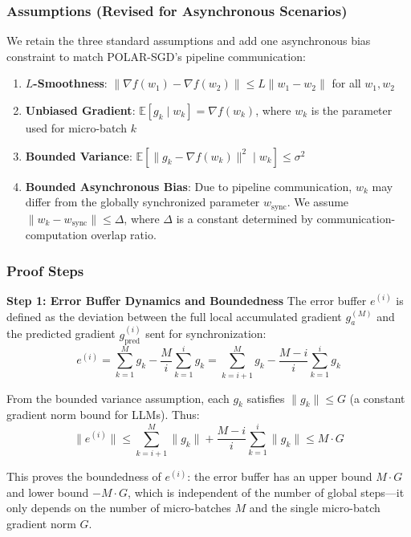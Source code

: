 \subsubsection{Assumptions (Revised for Asynchronous Scenarios)}
We retain the three standard assumptions and add one asynchronous bias constraint to match POLAR-SGD's pipeline communication:
\begin{enumerate}
  \item \textbf{$L$-Smoothness}: $\|\nabla f(w_1) - \nabla f(w_2)\| \leq L\|w_1 - w_2\|$ for all $w_1,w_2$
  \item \textbf{Unbiased Gradient}: $\mathbb{E}[g_{k} \mid w_k] = \nabla f(w_k)$, where $w_k$ is the parameter used for micro-batch $k$
  \item \textbf{Bounded Variance}: $\mathbb{E}\left[\|g_{k} - \nabla f(w_k)\|^2 \mid w_k\right] \leq \sigma^2$
  \item \textbf{Bounded Asynchronous Bias}: Due to pipeline communication, $w_k$ may differ from the globally synchronized parameter $w_{\text{sync}}$. We assume $\|w_k - w_{\text{sync}}\| \leq \Delta$, where $\Delta$ is a constant determined by communication-computation overlap ratio.
\end{enumerate}

\subsubsection{Proof Steps}
\textbf{Step 1: Error Buffer Dynamics and Boundedness}
The error buffer $e^{(i)}$ is defined as the deviation between the full local accumulated gradient $g_a^{(M)}$ and the predicted gradient $g_{\text{pred}}^{(i)}$ sent for synchronization:
\begin{equation}
e^{(i)} = \sum_{k=1}^M g_k - \frac{M}{i}\sum_{k=1}^i g_k = \sum_{k=i+1}^M g_k - \frac{M-i}{i}\sum_{k=1}^i g_k
\end{equation}

From the bounded variance assumption, each $g_k$ satisfies $\|g_k\| \leq G$ (a constant gradient norm bound for LLMs). Thus:
\begin{equation}
\|e^{(i)}\| \leq \sum_{k=i+1}^M \|g_k\| + \frac{M-i}{i}\sum_{k=1}^i \|g_k\| \leq M \cdot G
\end{equation}

This proves the boundedness of $e^{(i)}$: the error buffer has an upper bound $M \cdot G$ and lower bound $-M \cdot G$, which is independent of the number of global steps—it only depends on the number of micro-batches $M$ and the single micro-batch gradient norm $G$.

